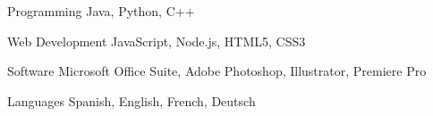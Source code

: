 

\begin{cvskills}

  \cvskill
    {Programming} %
    {Java, Python, C++} %
    
  \cvskill
    {Web Development} %
    {JavaScript, Node.js, HTML5, CSS3} %
    

  \cvskill
    {Software} %
    {Microsoft Office Suite, Adobe Photoshop, Illustrator, Premiere Pro} %

  \cvskill
    {Languages} %
    {Spanish, English, French, Deutsch} %

\end{cvskills}